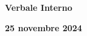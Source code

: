 \begin{center}
  \Huge\textbf{Verbale Interno}

  \Large\textbf{25 novembre 2024}
\end{center}

\bigskip

